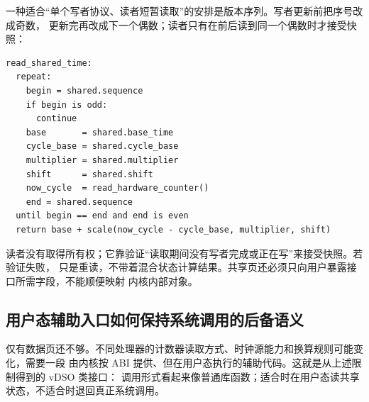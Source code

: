 一种适合“单个写者协议、读者短暂读取”的安排是版本序列。写者更新前把序号改成奇数，
更新完再改成下一个偶数；读者只有在前后读到同一个偶数时才接受快照：

\begin{lstlisting}
read_shared_time:
  repeat:
    begin = shared.sequence
    if begin is odd:
      continue
    base       = shared.base_time
    cycle_base = shared.cycle_base
    multiplier = shared.multiplier
    shift      = shared.shift
    now_cycle  = read_hardware_counter()
    end = shared.sequence
  until begin == end and end is even
  return base + scale(now_cycle - cycle_base, multiplier, shift)
\end{lstlisting}

读者没有取得所有权；它靠验证“读取期间没有写者完成或正在写”来接受快照。若验证失败，
只是重读，不带着混合状态计算结果。共享页还必须只向用户暴露接口所需字段，不能顺便映射
内核内部对象。

\subsection{用户态辅助入口如何保持系统调用的后备语义}

仅有数据页还不够。不同处理器的计数器读取方式、时钟源能力和换算规则可能变化，需要一段
由内核按 ABI 提供、但在用户态执行的辅助代码。这就是从上述限制得到的 vDSO 类接口：
调用形式看起来像普通库函数；适合时在用户态读共享状态，不适合时退回真正系统调用。

\begin{center}
\end{center}

